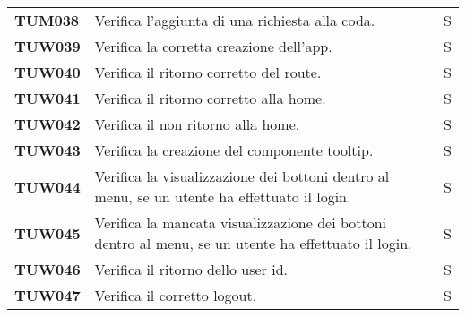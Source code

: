 \documentclass[../../piano-di-qualifica.tex]{subfiles}
\begin{document}
\begin{longtable}[H]{>{\centering\bfseries}m{3cm} >{}m{10cm} >{\centering\arraybackslash}m{3cm}}
  TUM038             & Verifica l'aggiunta di una richiesta alla coda.                                                                     & S                             \\ %



  TUW039             & Verifica la corretta creazione dell'app.                                                                            & S                             \\

  TUW040             & Verifica il ritorno corretto del route.                                                                             & S                             \\

  TUW041             & Verifica il ritorno corretto alla home.                                                                             & S                             \\

  TUW042             & Verifica il non ritorno alla home.                                                                                  & S                             \\

  TUW043             & Verifica la creazione del componente tooltip.                                                                       & S                             \\

  TUW044             & Verifica la visualizzazione dei bottoni dentro al menu, se un utente ha effettuato il login.                        & S                             \\

  TUW045             & Verifica la mancata visualizzazione dei bottoni dentro al menu, se un utente ha effettuato il login.                & S                             \\

  TUW046             & Verifica il ritorno dello user id.                                                                                  & S                             \\

  TUW047             & Verifica il corretto logout.                                                                                        & S                             \\


\end{longtable}
\end{document}
